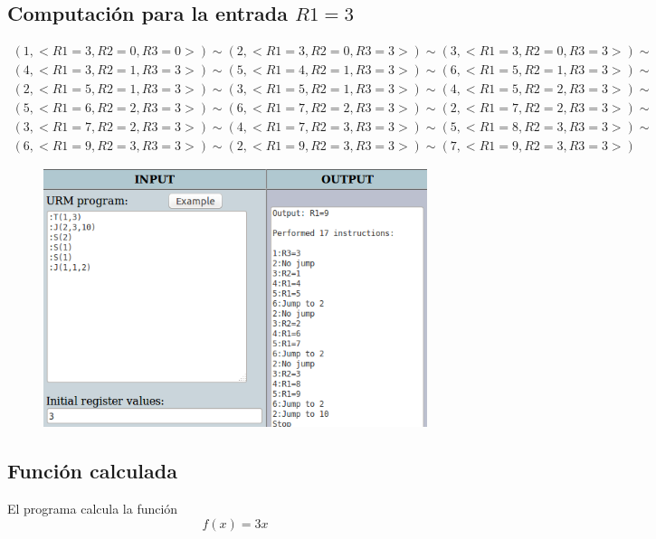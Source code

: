 	\subsection{Computación para la entrada $R1=3$}
	\begin{equation*}\begin{gathered}
	(1, <R1=3, R2=0, R3=0>) \sim (2, <R1=3, R2=0, R3=3>) \sim (3, <R1=3, R2=0, R3=3>) \sim\\
	(4, <R1=3, R2=1, R3=3>) \sim (5, <R1=4, R2=1, R3=3>) \sim (6, <R1=5, R2=1, R3=3>) \sim\\
	(2, <R1=5, R2=1, R3=3>) \sim (3, <R1=5, R2=1, R3=3>) \sim (4, <R1=5, R2=2, R3=3>) \sim\\
	(5, <R1=6, R2=2, R3=3>) \sim (6, <R1=7, R2=2, R3=3>) \sim (2, <R1=7, R2=2, R3=3>) \sim\\
	(3, <R1=7, R2=2, R3=3>) \sim (4, <R1=7, R2=3, R3=3>) \sim (5, <R1=8, R2=3, R3=3>) \sim\\
	(6, <R1=9, R2=3, R3=3>) \sim (2, <R1=9, R2=3, R3=3>) \sim (7, <R1=9, R2=3, R3=3>)
	\end{gathered}\end{equation*}
	\begin{figure}[H]
  		\centering
  		\includegraphics[scale=0.5]{images/83.png}
  	\end{figure}
	\subsection{Función calculada}
	El programa calcula la función
	\begin{equation*}
		f(x)=3x
	\end{equation*}
